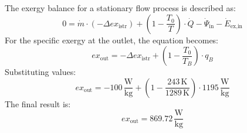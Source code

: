 The exergy balance for a stationary flow process is described as:  
\[
0 = \dot{m} \cdot (-\Delta ex_{\text{istr}}) + \left( 1 - \frac{T_0}{T} \right) \cdot \dot{Q} - \dot{\Psi}_{\text{in}} - \dot{E}_{\text{ex,in}}
\]  
For the specific exergy at the outlet, the equation becomes:  
\[
ex_{\text{out}} = -\Delta ex_{\text{istr}} + \left( 1 - \frac{T_0}{T_B} \right) \cdot q_B
\]  
Substituting values:  
\[
ex_{\text{out}} = -100 \, \frac{\text{W}}{\text{kg}} + \left( 1 - \frac{243 \, \text{K}}{1289 \, \text{K}} \right) \cdot 1195 \, \frac{\text{W}}{\text{kg}}
\]  
The final result is:  
\[
ex_{\text{out}} = 869.72 \, \frac{\text{W}}{\text{kg}}
\]